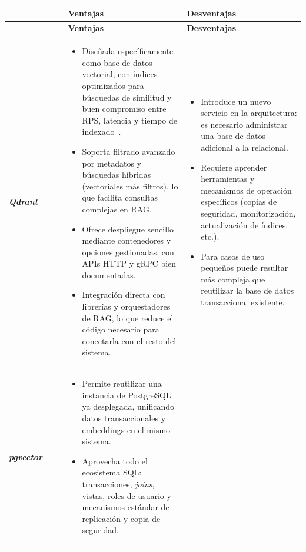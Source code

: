 \begin{longtable}{
		p{0.20\linewidth}
		p{0.40\linewidth}
		p{0.40\linewidth}
	}
	
    \toprule
    & \textbf{Ventajas} & \textbf{Desventajas} \\
    \midrule
    \endfirsthead

	\toprule
	& \textbf{Ventajas} & \textbf{Desventajas} \\
	\midrule
	\endhead
    \textbf{\textit{Qdrant}} &
      \begin{itemize}
        \tightlist
        \item Diseñada específicamente como base de datos vectorial, con índices optimizados para búsquedas de similitud y buen compromiso entre RPS, latencia y tiempo de indexado~\cite{llmeng:handbook}.
        \item Soporta filtrado avanzado por metadatos y búsquedas híbridas (vectoriales más filtros), lo que facilita consultas complejas en RAG.
        \item Ofrece despliegue sencillo mediante contenedores y opciones gestionadas, con APIs HTTP y gRPC bien documentadas.
        \item Integración directa con librerías y orquestadores de RAG, lo que reduce el código necesario para conectarla con el resto del sistema.
      \end{itemize}
      &
      \begin{itemize}
        \tightlist
        \item Introduce un nuevo servicio en la arquitectura: es necesario administrar una base de datos adicional a la relacional.
        \item Requiere aprender herramientas y mecanismos de operación específicos (copias de seguridad, monitorización, actualización de índices, etc.).
        \item Para casos de uso pequeños puede resultar más compleja que reutilizar la base de datos transaccional existente.
      \end{itemize}
      \\
    \midrule
    \textbf{\textit{pgvector}} &
      \begin{itemize}
        \tightlist
        \item Permite reutilizar una instancia de PostgreSQL ya desplegada, unificando datos transaccionales y embeddings en el mismo sistema.
        \item Aprovecha todo el ecosistema SQL: transacciones, \textit{joins}, vistas, roles de usuario y mecanismos estándar de replicación y copia de seguridad.

\end{itemize}
\end{longtable}
